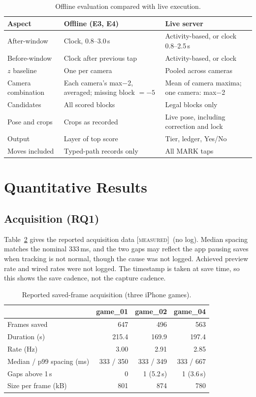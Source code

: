 \documentclass[conference,10pt]{IEEEtran}
\newcommand{\evM}{\textsc{[measured]}}
\begin{document}
\begin{table}[!t]
\caption{Offline evaluation compared with live execution.}\label{tab:offline}
\centering\footnotesize
\begin{tabular}{@{}p{2.1cm}p{2.8cm}p{2.9cm}@{}}
\toprule
Aspect & Offline (E3, E4) & Live server \\
\midrule
After-window & Clock, 0.8--3.0\,s & Activity-based, or clock 0.8--2.5\,s \\
Before-window & Clock after previous tap & Activity-based, or clock \\
$z$ baseline & One per camera & Pooled across cameras \\
Camera combination & Each camera's max$-$2, averaged; missing block $=-5$ & Mean of camera maxima; one camera: max$-$2 \\
Candidates & All scored blocks & Legal blocks only \\
Pose and crops & Crops as recorded & Live pose, including correction and lock \\
Output & Layer of top score & Tier, ledger, Yes/No \\
Moves included & Typed-path records only & All MARK taps \\
\bottomrule
\end{tabular}
\end{table}

\section{Quantitative Results}\label{sec:quant}
\subsection{Acquisition (RQ1)}
Table~\ref{tab:acq} gives the reported acquisition data \evM\ (no log). Median spacing matches the nominal 333\,ms, and the two gaps may reflect the app pausing saves when tracking is not normal, though the cause was not logged. Achieved preview rate and wired rates were not logged. The timestamp is taken at save time, so this shows the save cadence, not the capture cadence.

\begin{table}[!t]
\caption{Reported saved-frame acquisition (three iPhone games).}\label{tab:acq}
\centering\footnotesize
\begin{tabular}{@{}lrrr@{}}
\toprule
 & game\_01 & game\_02 & game\_04 \\
\midrule
Frames saved & 647 & 496 & 563 \\
Duration (s) & 215.4 & 169.9 & 197.4 \\
Rate (Hz) & 3.00 & 2.91 & 2.85 \\
Median / p99 spacing (ms) & 333 / 350 & 333 / 349 & 333 / 667 \\
Gaps above 1\,s & 0 & 1 (5.2\,s) & 1 (3.6\,s) \\
Size per frame (kB) & 801 & 874 & 780 \\
\bottomrule
\end{tabular}
\end{table}
\end{document}
